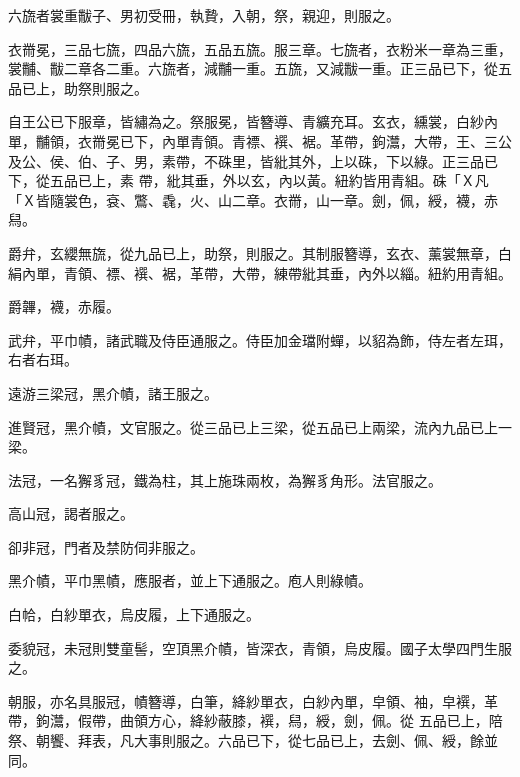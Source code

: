 \begin{pinyinscope}
 六旒者裳重黻子、男初受冊，執贄，入朝，祭，親迎，則服之。



 衣黹冕，三品七旒，四品六旒，五品五旒。服三章。七旒者，衣粉米一章為三重，裳黼、黻二章各二重。六旒者，減黼一重。五旒，又減黻一重。正三品已下，從五品已上，助祭則服之。



 自王公已下服章，皆繡為之。祭服冕，皆簪導、青纊充耳。玄衣，纁裳，白紗內單，黼領，衣黹冕已下，內單青領。青褾、襈、裾。革帶，鉤灊，大帶，王、三公及公、侯、伯、子、男，素帶，不硃里，皆紕其外，上以硃，下以綠。正三品已下，從五品已上，素
 帶，紕其垂，外以玄，內以黃。紐約皆用青組。硃「Ｘ凡「Ｘ皆隨裳色，袞、鷩、毳，火、山二章。衣黹，山一章。劍，佩，綬，襪，赤舄。



 爵弁，玄纓無旒，從九品已上，助祭，則服之。其制服簪導，玄衣、薰裳無章，白絹內單，青領、褾、襈、裾，革帶，大帶，練帶紕其垂，內外以緇。紐約用青組。



 爵韠，襪，赤履。



 武弁，平巾幘，諸武職及侍臣通服之。侍臣加金璫附蟬，以貂為飾，侍左者左珥，右者右珥。



 遠游三梁冠，黑介幘，諸王服之。



 進賢冠，黑介幘，文官服之。從三品已上三梁，從五品已上兩梁，流內九品已上一梁。



 法冠，一名獬豸冠，鐵為柱，其上施珠兩枚，為獬豸角形。法官服之。



 高山冠，謁者服之。



 卻非冠，門者及禁防伺非服之。



 黑介幘，平巾黑幘，應服者，並上下通服之。庖人則綠幘。



 白帢，白紗單衣，烏皮履，上下通服之。



 委貌冠，未冠則雙童髻，空頂黑介幘，皆深衣，青領，烏皮履。國子太學四門生服之。



 朝服，亦名具服冠，幘簪導，白筆，絳紗單衣，白紗內單，皁領、袖，皁襈，革帶，鉤灊，假帶，曲領方心，絳紗蔽膝，襈，舄，綬，劍，佩。從
 五品已上，陪祭、朝饗、拜表，凡大事則服之。六品已下，從七品已上，去劍、佩、綬，餘並同。




\end{pinyinscope}
